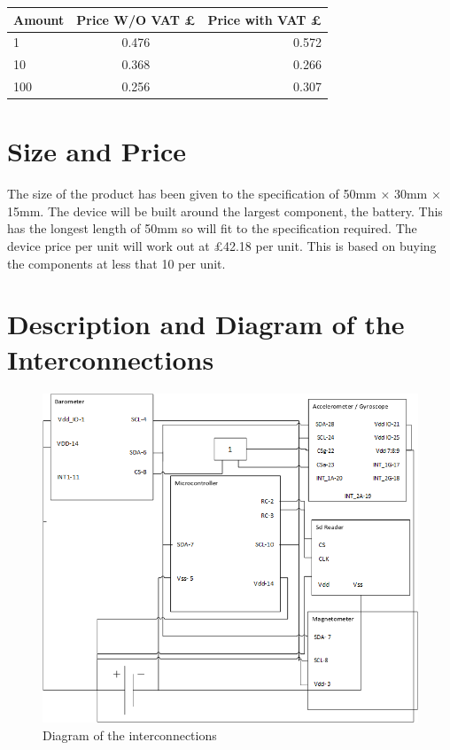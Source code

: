 \documentclass{report}
\begin{document}
\begin{center}
  \begin{tabular}{ | l | c | r |}
    \hline
    Amount & Price W/O VAT £ & Price with VAT £ \\ \hline
    1 & 0.476 & 0.572 \\ \hline
    10 & 0.368 & 0.266 \\ \hline
    100 & 0.256 & 0.307 \\ \hline
	\end{tabular}
\end{center}


\section{Size and Price}
The size of the product  has been given to the specification of 50mm × 30mm × 15mm. The device will be built around the largest component, the battery. This has the longest length of 50mm so will fit to the specification required.
The device price per unit will work out at £42.18 per unit. This is based on buying the components at less that 10 per unit.
\section{Description and Diagram of the Interconnections}

\begin{figure}[ht!]
\centering
\includegraphics[width=115mm]{MainImage.png}
\caption{Diagram of the interconnections}
\label{overflow}
\end{figure}
\end{document}
